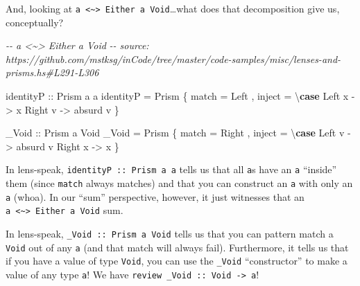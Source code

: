 \documentclass[]{article}
\newenvironment{Shaded}{}{}
\newcommand{\CommentTok}[1]{\textcolor[rgb]{0.38,0.63,0.69}{\textit{#1}}}
\newcommand{\DataTypeTok}[1]{\textcolor[rgb]{0.56,0.13,0.00}{#1}}
\newcommand{\KeywordTok}[1]{\textcolor[rgb]{0.00,0.44,0.13}{\textbf{#1}}}
\newcommand{\NormalTok}[1]{#1}
\newcommand{\OtherTok}[1]{\textcolor[rgb]{0.00,0.44,0.13}{#1}}
\begin{document}
And, looking at
\texttt{a\ \textless{}\textasciitilde{}\textgreater{}\ Either\ a\ Void}\ldots what
does that decomposition give us, conceptually?

\begin{Shaded}
\begin{Highlighting}[]
\CommentTok{{-}{-} a \textless{}\textasciitilde{}\textgreater{} Either a Void}
\CommentTok{{-}{-} source: https://github.com/mstksg/inCode/tree/master/code{-}samples/misc/lenses{-}and{-}prisms.hs\#L291{-}L306}

\OtherTok{identityP ::} \DataTypeTok{Prism\textquotesingle{}}\NormalTok{ a a}
\NormalTok{identityP }\OtherTok{=} \DataTypeTok{Prism\textquotesingle{}}
\NormalTok{    \{ match }\OtherTok{=} \DataTypeTok{Left}
\NormalTok{    , inject }\OtherTok{=}\NormalTok{ \textbackslash{}}\KeywordTok{case}
        \DataTypeTok{Left}\NormalTok{  x }\OtherTok{{-}\textgreater{}}\NormalTok{ x}
        \DataTypeTok{Right}\NormalTok{ v }\OtherTok{{-}\textgreater{}}\NormalTok{ absurd v}
\NormalTok{    \}}

\OtherTok{\_Void ::} \DataTypeTok{Prism\textquotesingle{}}\NormalTok{ a }\DataTypeTok{Void}
\NormalTok{\_Void }\OtherTok{=} \DataTypeTok{Prism\textquotesingle{}}
\NormalTok{    \{ match }\OtherTok{=} \DataTypeTok{Right}
\NormalTok{    , inject }\OtherTok{=}\NormalTok{ \textbackslash{}}\KeywordTok{case}
        \DataTypeTok{Left}\NormalTok{  v }\OtherTok{{-}\textgreater{}}\NormalTok{ absurd v}
        \DataTypeTok{Right}\NormalTok{ x }\OtherTok{{-}\textgreater{}}\NormalTok{ x}
\NormalTok{    \}}
\end{Highlighting}
\end{Shaded}

In lens-speak, \texttt{identityP\ ::\ Prism\textquotesingle{}\ a\ a} tells us
that all \texttt{a}s have an \texttt{a} ``inside'' them (since \texttt{match}
always matches) and that you can construct an \texttt{a} with only an \texttt{a}
(whoa). In our ``sum'' perspective, however, it just witnesses that an
\texttt{a\ \textless{}\textasciitilde{}\textgreater{}\ Either\ a\ Void} sum.

In lens-speak, \texttt{\_Void\ ::\ Prism\textquotesingle{}\ a\ Void} tells us
that you can pattern match a \texttt{Void} out of any \texttt{a} (and that match
will always fail). Furthermore, it tells us that if you have a value of type
\texttt{Void}, you can use the \texttt{\_Void} ``constructor'' to make a value
of any type \texttt{a}! We have
\texttt{review\ \_Void\ ::\ Void\ -\textgreater{}\ a}!
\end{document}

